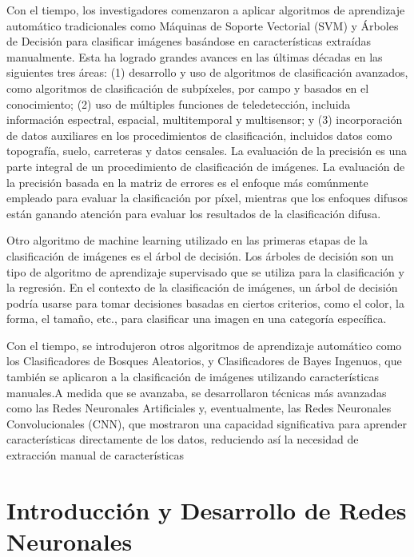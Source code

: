Con el tiempo, los investigadores comenzaron a aplicar algoritmos de aprendizaje automático tradicionales como Máquinas de Soporte Vectorial (SVM) y 
Árboles de Decisión para clasificar imágenes %
basándose en características extraídas manualmente. Esta ha logrado grandes avances en las últimas décadas en las siguientes tres áreas: (1) desarrollo y uso de algoritmos de clasificación avanzados, como algoritmos de clasificación de subpíxeles, por campo y basados en el conocimiento; (2) uso de múltiples funciones de teledetección, incluida información espectral, espacial, multitemporal y multisensor; y (3) incorporación de datos auxiliares en los procedimientos de clasificación, incluidos datos como topografía, suelo, carreteras y datos censales. La evaluación de la precisión es una parte integral de un procedimiento de clasificación de imágenes. La evaluación de la precisión basada en la matriz de errores es el enfoque más comúnmente empleado para evaluar la clasificación por píxel, mientras que los enfoques difusos están ganando atención para evaluar los resultados de la clasificación difusa. %

Otro algoritmo de machine learning utilizado en las primeras etapas de la clasificación de imágenes es el árbol de decisión. Los árboles de decisión son un tipo de algoritmo de aprendizaje supervisado que se utiliza para la clasificación y la regresión. En el contexto de la clasificación de imágenes, un árbol de decisión podría usarse para tomar decisiones basadas en ciertos criterios, como el color, la forma, el tamaño, etc., para clasificar una imagen en una categoría específica.

Con el tiempo, se introdujeron otros algoritmos de aprendizaje automático como los Clasificadores de Bosques Aleatorios, y Clasificadores de Bayes Ingenuos, que 
también se aplicaron a la clasificación de imágenes utilizando características manuales.A medida que se avanzaba, se desarrollaron técnicas más avanzadas como las Redes Neuronales Artificiales y, eventualmente, las Redes Neuronales Convolucionales (CNN), que mostraron una capacidad significativa para aprender características directamente de los datos, reduciendo así la necesidad de extracción manual de características %

\section*{Introducción y Desarrollo de Redes Neuronales}

